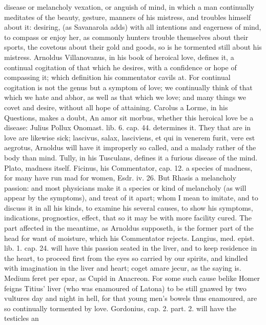 {disease or melancholy vexation, or anguish of mind, in which a man
continually meditates of the beauty, gesture, manners of his mistress,
and troubles himself about it: desiring, (as Savanarola adds) with all
intentions and eagerness of mind, to compass or enjoy her, as
commonly hunters trouble themselves about their sports, the covetous
about their gold and goods, so is he tormented still about his
mistress. Arnoldus Villanovanus, in his book of heroical love, defines
it, a continual cogitation of that which he desires, with a
confidence or hope of compassing it; which definition his commentator
cavils at. For continual cogitation is not the genus but a symptom of
love; we continually think of that which we hate and abhor, as well as
that which we love; and many things we covet and desire, without all
hope of attaining. Carolus a Lorme, in his Questions, makes a doubt, An
amor sit morbus, whether this heroical love be a disease: Julius Pollux
Onomast. lib. 6. cap. 44. determines it. They that are in love are
likewise sick; lascivus, salax, lasciviens, et qui in venerem
furit, vere est aegrotus, Arnoldus will have it improperly so called,
and a malady rather of the body than mind. Tully, in his Tusculans,
defines it a furious disease of the mind. Plato, madness itself.
Ficinus, his Commentator, cap. 12. a species of madness, for many have
run mad for women, Esdr. iv. 26. But Rhasis a melancholy passion:
and most physicians make it a species or kind of melancholy (as will
appear by the symptoms), and treat of it apart; whom I mean to imitate,
and to discuss it in all his kinds, to examine his several causes, to
show his symptoms, indications, prognostics, effect, that so it may be
with more facility cured.
The part affected in the meantime, as Arnoldus supposeth, is the
former part of the head for want of moisture, which his Commentator
rejects. Langius, med. epist. lib. 1. cap. 24. will have this passion
seated in the liver, and to keep residence in the heart, to
proceed first from the eyes so carried by our spirits, and kindled with
imagination in the liver and heart; coget amare jecur, as the saying
is. Medium feret per epar, as Cupid in Anacreon. For some such cause
belike  Homer feigns Titius' liver (who was enamoured of Latona)
to be still gnawed by two vultures day and night in hell, for
that young men's bowels thus enamoured, are so continually tormented by
love. Gordonius, cap. 2. part. 2. will have the testicles an
}
